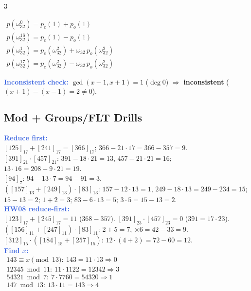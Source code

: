 \documentclass[9pt]{extarticle}
\newcommand{\hl}[1]{\textbf{\textcolor{BrickRed}{#1}}}
\newcommand{\ex}[1]{\textbf{\textcolor{RoyalBlue}{#1}}}
\begin{document}
\begin{multicols}{3}
\begin{sloppypar}
\end{sloppypar}
$\begin{array}{l}
p(\omega_{32}^0)=p_e(1)+p_o(1)\\
p(\omega_{32}^{16})=p_e(1)-p_o(1)\\
p(\omega_{32}^1)=p_e(\omega_{32}^2)+\omega_{32}\,p_o(\omega_{32}^2)\\
p(\omega_{32}^{17})=p_e(\omega_{32}^2)-\omega_{32}\,p_o(\omega_{32}^2)
\end{array}$
\begin{sloppypar}\raggedright
\ex{Inconsistent check:} $\gcd(x{-}1,x{+}1){=}1$ ($\deg0$) $\Rightarrow$ \hl{inconsistent} ($(x{+}1){-}(x{-}1){=}2{\ne}0$).
\end{sloppypar}

\subsection{Mod + Groups/FLT Drills}
\begin{sloppypar}\raggedright
\ex{Reduce first:}\\
$[125]_{17}{+}[241]_{17}{=}[366]_{17}$; $366{-}21{\cdot}17{=}366{-}357{=}9$.\\
$[391]_{21}{\cdot}[457]_{21}$: $391{-}18{\cdot}21{=}13$, $457{-}21{\cdot}21{=}16$; $13{\cdot}16{=}208{-}9{\cdot}21{=}19$.\\
$[94]_7$: $94{-}13{\cdot}7{=}94{-}91{=}3$.\\
$([157]_{13}{+}[249]_{13}){\cdot}[83]_{13}$: $157{-}12{\cdot}13{=}1$, $249{-}18{\cdot}13{=}249{-}234{=}15$; $15{-}13{=}2$; $1{+}2{=}3$; $83{-}6{\cdot}13{=}5$; $3{\cdot}5{=}15{-}13{=}2$.\\
\ex{HW08 reduce-first:}\\
$[123]_{17}{+}[245]_{17}{=}11$ ($368{-}357$). $[391]_{23}{\cdot}[457]_{23}{=}0$ ($391{=}17{\cdot}23$).\\
$([156]_{11}{+}[247]_{11}){\cdot}[83]_{11}$: $2{+}5{=}7$, ${\times}6{=}42{-}33{=}9$. $[312]_{15}{\cdot}([184]_{15}{+}[257]_{15})$: $12{\cdot}(4{+}2){=}72{-}60{=}12$.\\
\ex{Find $x$:}\\
$\begin{array}{l}
143\equiv x\pmod{13}:\ 143{=}11{\cdot}13\Rightarrow0\\
12345\bmod11:\ 11{\cdot}1122{=}12342\Rightarrow3\\
54321\bmod7:\ 7{\cdot}7760{=}54320\Rightarrow1\\
147\bmod13:\ 13{\cdot}11{=}143\Rightarrow4
\end{array}$\\

\end{sloppypar}
\end{multicols}
\end{document}
